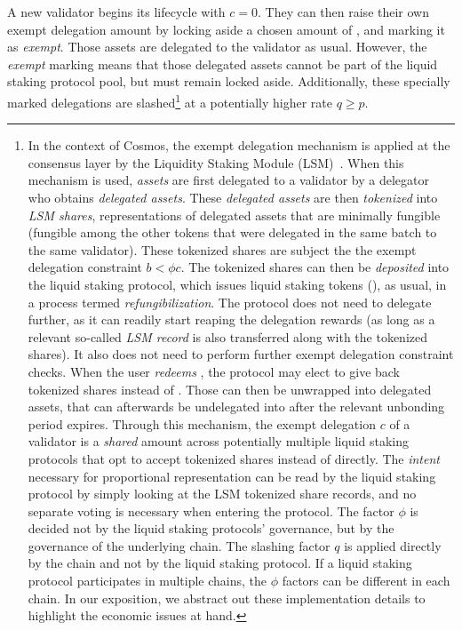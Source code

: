 A new validator begins its lifecycle with $c = 0$. They can then
raise their own exempt delegation amount by locking aside a
chosen amount of \asset, and marking it as \emph{exempt}. Those
assets are delegated to the validator as usual. However,
the \emph{exempt}
marking means that those delegated assets cannot be part of the liquid
staking protocol pool, but must remain locked aside. Additionally,
these specially marked delegations are slashed\footnote{In the context
of Cosmos, the exempt delegation mechanism is applied at the consensus
layer by the Liquidity Staking Module (LSM)~\cite{liquidity-staking-module}.
When this mechanism is used, \emph{assets} are first delegated to a validator by
a delegator who obtains \emph{delegated assets}. These \emph{delegated assets} are then
\emph{tokenized} into \emph{LSM shares}, representations of delegated assets that
are minimally fungible (fungible among the other tokens that were delegated in the
same batch to the same validator). These tokenized
shares are subject the the exempt delegation constraint $b < \phi c$. The tokenized shares
can then be \emph{deposited} into the liquid staking protocol, which issues liquid staking
tokens (\stassets), as usual, in a process termed \emph{refungibilization}.
The protocol does not need to delegate further, as it can readily start reaping the
delegation rewards (as long as a relevant so-called \emph{LSM record} is also transferred
along with the tokenized shares).
It also does not need to perform further exempt delegation constraint checks.
When the user \emph{redeems} \stassets, the protocol may elect to give
back tokenized shares instead of \assets. Those can then be unwrapped into delegated assets,
that can afterwards be undelegated into \assets after the relevant unbonding
period expires.
Through this mechanism, the exempt delegation $c$ of a validator is
a \emph{shared} amount across potentially multiple liquid staking
protocols that opt to accept tokenized shares
instead of \assets directly. The \emph{intent} necessary for proportional
representation can be read by the liquid staking protocol by simply
looking at the LSM tokenized share records, and no separate voting is
necessary when entering the protocol. The factor $\phi$ is decided not by the
liquid staking protocols' governance, but by the governance of
the underlying chain. The slashing factor $q$ is applied directly
by the chain and not by the liquid staking protocol.
If a liquid staking protocol participates in
multiple chains, the $\phi$ factors can be different in each chain.
In our exposition, we abstract out these implementation details to highlight
the economic issues at hand.}
at a potentially higher rate $q \geq p$.

